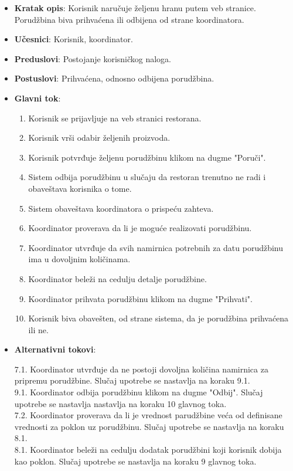 \begin{itemize}
    \item \textbf{Kratak opis}: Korisnik naručuje željenu hranu putem veb stranice. Porudžbina biva prihvaćena ili odbijena od strane koordinatora.
    \item \textbf{Učesnici}: Korisnik, koordinator.
    \item \textbf{Preduslovi}: Postojanje korisničkog naloga.
    \item \textbf{Postuslovi}: Prihvaćena, odnosno odbijena porudžbina.
    \item \textbf{Glavni tok}:
    \begin{enumerate}
        \item Korisnik se prijavljuje na veb stranici restorana.
        \item Korisnik vrši odabir željenih proizvoda.
        \item Korisnik potvrđuje željenu porudžbinu klikom na dugme "Poruči".
        \item Sistem odbija porudžbinu u slučaju da restoran trenutno ne radi i obaveštava korisnika o tome.
        \item Sistem obaveštava koordinatora o prispeću zahteva.
        \item Koordinator proverava da li je moguće realizovati porudžbinu.
        \item Koordinator utvrđuje da svih namirnica potrebnih za datu porudžbinu ima u dovoljnim količinama.
        \item Koordinator beleži na cedulju detalje porudžbine.
        \item Koordinator prihvata porudžbinu klikom na dugme "Prihvati".
        \item Korisnik biva obavešten, od strane sistema, da je porudžbina prihvaćena ili ne.
     \end{enumerate}
     \item \textbf{Alternativni tokovi}:
     
     7.1. Koordinator utvrđuje da ne postoji dovoljna količina namirnica za pripremu porudžbine. Slučaj upotrebe se nastavlja na koraku 9.1.\\
     9.1. Koordinator odbija porudžbinu klikom na dugme "Odbij". Slučaj upotrebe se nastavlja  nastavlja na koraku 10 glavnog toka.\\
     7.2. Koordinator proverava da li je vrednost parudžbine veća od definisane vrednosti za poklon uz porudžbinu. Slučaj upotrebe se nastavlja na koraku 8.1.\\
     8.1. Koordinator beleži na cedulju dodatak porudžbini koji korisnik dobija kao poklon. Slučaj upotrebe se nastavlja na koraku 9 glavnog toka.\\
    
\end{itemize}

